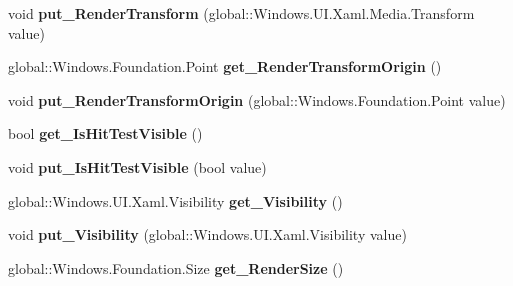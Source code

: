 \begin{DoxyCompactItemize}
void {\bfseries put\+\_\+\+Render\+Transform} (global\+::\+Windows.\+U\+I.\+Xaml.\+Media.\+Transform value)
\item 
\mbox{\label{interface_windows_1_1_u_i_1_1_xaml_1_1_i_u_i_element_a5fa81294c9c6de8e157213ee727bd1c2}} 
global\+::\+Windows.\+Foundation.\+Point {\bfseries get\+\_\+\+Render\+Transform\+Origin} ()
\item 
\mbox{\label{interface_windows_1_1_u_i_1_1_xaml_1_1_i_u_i_element_a05d8af2ba53053be8810ef8ca2e32f36}} 
void {\bfseries put\+\_\+\+Render\+Transform\+Origin} (global\+::\+Windows.\+Foundation.\+Point value)
\item 
\mbox{\label{interface_windows_1_1_u_i_1_1_xaml_1_1_i_u_i_element_a08d625eccb089821ca78a7845cb5509c}} 
bool {\bfseries get\+\_\+\+Is\+Hit\+Test\+Visible} ()
\item 
\mbox{\label{interface_windows_1_1_u_i_1_1_xaml_1_1_i_u_i_element_aa80fb34be2e9e897b9dc8f558796ab51}} 
void {\bfseries put\+\_\+\+Is\+Hit\+Test\+Visible} (bool value)
\item 
\mbox{\label{interface_windows_1_1_u_i_1_1_xaml_1_1_i_u_i_element_a1d08cd5eebdac6a853903eb22a27b689}} 
global\+::\+Windows.\+U\+I.\+Xaml.\+Visibility {\bfseries get\+\_\+\+Visibility} ()
\item 
\mbox{\label{interface_windows_1_1_u_i_1_1_xaml_1_1_i_u_i_element_aad5d9c40429e519a8d16db9da184a42b}} 
void {\bfseries put\+\_\+\+Visibility} (global\+::\+Windows.\+U\+I.\+Xaml.\+Visibility value)
\item 
\mbox{\label{interface_windows_1_1_u_i_1_1_xaml_1_1_i_u_i_element_a436b4b809e5f92e434326f446a1b3fb0}} 
global\+::\+Windows.\+Foundation.\+Size {\bfseries get\+\_\+\+Render\+Size} ()
\item 
\mbox{\label{interface_windows_1_1_u_i_1_1_xaml_1_1_i_u_i_element_ac7efa9d3bcb66e3a95621d9e942b339d}} 

\end{DoxyCompactItemize}
